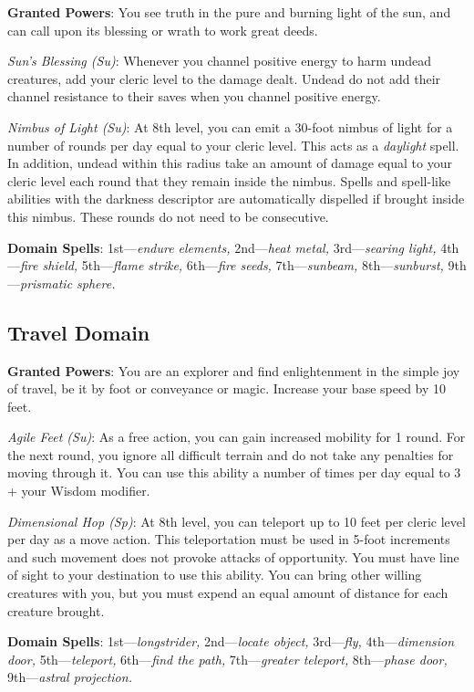 				
\textbf{Granted Powers}: You see truth in the pure and burning light of the sun, and can call upon its blessing or wrath to work great deeds.
				
\textit{Sun's Blessing (Su)}: Whenever you channel positive energy to harm undead creatures, add your cleric level to the damage dealt. Undead do not add their channel resistance to their saves when you channel positive energy.
				
\textit{Nimbus of Light (Su)}: At 8th level, you can emit a 30-foot nimbus of light for a number of rounds per day equal to your cleric level. This acts as a \textit{daylight }spell. In addition, undead within this radius take an amount of damage equal to your cleric level each round that they remain inside the nimbus. Spells and spell-like abilities with the darkness descriptor are automatically dispelled if brought inside this nimbus. These rounds do not need to be consecutive.
				
\textbf{Domain Spells}: 1st---\textit{endure elements, }2nd---\textit{heat metal,} 3rd---\textit{searing light, }4th---\textit{fire shield, }5th---\textit{flame strike, }6th---\textit{fire seeds, }7th---\textit{sunbeam, }8th---\textit{sunburst, }9th---\textit{prismatic sphere.}
				
\subsection{Travel Domain}

				
\textbf{Granted Powers}: You are an explorer and find enlightenment in the simple joy of travel, be it by foot or conveyance or magic. Increase your base speed by 10 feet.
				
\textit{Agile Feet (Su)}: As a free action, you can gain increased mobility for 1 round. For the next round, you ignore all difficult terrain and do not take any penalties for moving through it. You can use this ability a number of times per day equal to 3 + your Wisdom modifier.
				
\textit{Dimensional Hop (Sp)}: At 8th level, you can teleport up to 10 feet per cleric level per day as a move action. This teleportation must be used in 5-foot increments and such movement does not provoke attacks of opportunity. You must have line of sight to your destination to use this ability. You can bring other willing creatures with you, but you must expend an equal amount of distance for each creature brought.
				
\textbf{Domain Spells}: 1st---\textit{longstrider, }2nd---\textit{locate object,} 3rd---\textit{fly, }4th---\textit{dimension door, }5th---\textit{teleport, }6th---\textit{find the path, }7th---\textit{greater teleport, }8th---\textit{phase door, }9th---\textit{astral projection.}
				
